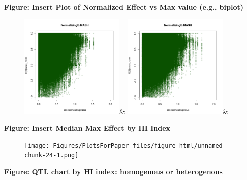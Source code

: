 \textbf{Figure: Insert Plot of Normalized Effect vs Max value (e.g., biplot)}
\newline
\begin{figure}[htbp]
\includegraphics[width=5cm]{Figures/normstuffeb_nobrain.png}&
\includegraphics[width=5cm]{Figures/normstuffeb_alltissues.png}&
\end{figure}\newline

\textbf{Figure: Insert Median Max Effect by HI Index}
\newline
\begin{figure}[htbp]
\texttt{[image: Figures/PlotsForPaper\_files/figure-html/unnamed-chunk-24-1.png]}\\
\end{figure}\newline

\textbf{Figure: QTL chart by HI index: homogenous or heterogenous}




